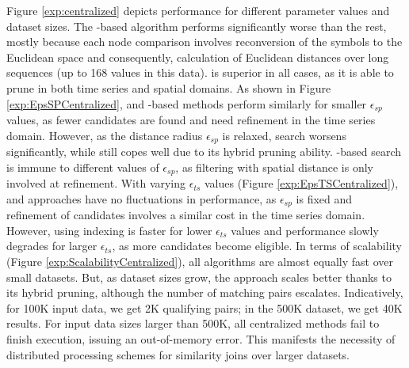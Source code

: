 Figure \ref{exp:centralized} depicts performance for different parameter values and dataset sizes. The \isax-based algorithm performs significantly worse than the rest, mostly because each node comparison involves reconversion of the \isax symbols to the Euclidean space \cite{shieh2008kdd} and consequently, calculation of Euclidean distances over long sequences (up to 168 values in this data). \btsr is superior in all cases, as it is able to prune in both time series and spatial domains. As shown in Figure \ref{exp:EpsSPCentralized}, \btsr and \rtree-based methods perform similarly for smaller $\epsilon_{sp}$ values, as fewer candidates are found and need refinement in the time series domain. However, as the distance radius $\epsilon_{sp}$ is relaxed, \rtree search worsens significantly, while \btsr still copes well due to its hybrid pruning ability. \isax-based search is immune to different values of $\epsilon_{sp}$, as filtering with spatial distance is only involved at refinement. With varying $\epsilon_{ts}$ values (Figure \ref{exp:EpsTSCentralized}), \btsr and \rtree approaches have no fluctuations in performance, as $\epsilon_{sp}$ is fixed and refinement of candidates involves a similar cost in the time series domain. However, using \isax indexing is faster for lower $\epsilon_{ts}$ values and performance slowly degrades for larger $\epsilon_{ts}$, as more candidates become eligible. In terms of scalability (Figure \ref{exp:ScalabilityCentralized}), all algorithms are almost equally fast over small datasets. But, as dataset sizes grow, the \btsr approach scales better thanks to its hybrid pruning, although the number of matching pairs escalates. Indicatively, for 100K input data, we get 2K qualifying pairs; in the 500K dataset, we get 40K results. For input data sizes larger than 500K, all centralized methods fail to finish execution, issuing an out-of-memory error. This manifests the necessity of distributed processing schemes for similarity joins over larger datasets.



\label{subsec:distributed_results}


